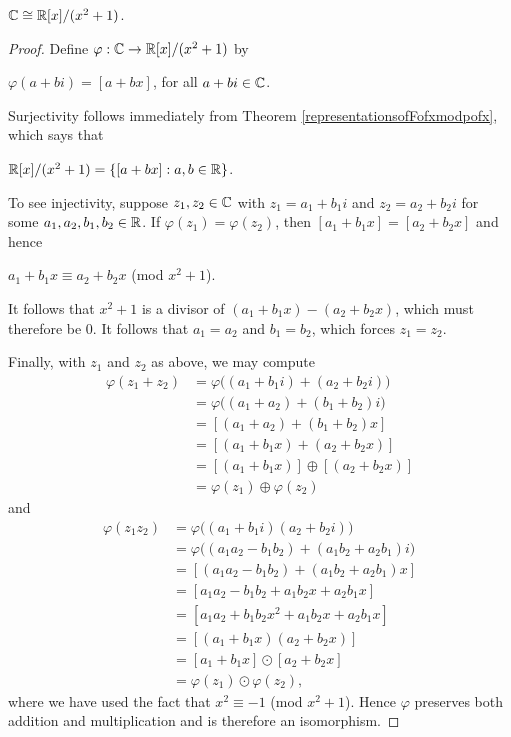 \documentclass[11pt,fleqn,dvipsnames,usenames]{article}
\newcommand{\p}{\noindent}
\begin{document}
\begin{theorem}
$\mathbb{C}\cong\mathbb{R}[x]/(x^2+1)$.
\end{theorem}
%
\begin{proof}
Define $\varphi:\mathbb{C}\to\mathbb{R}[x]/(x^2+1)$ by
\begin{center}
$\varphi(a + bi) = [a + bx]$, for all $a+bi\in\mathbb{C}$.
\end{center}
Surjectivity follows immediately from Theorem \ref{representationsofFofxmodpofx}, which says that
\begin{center}
$\mathbb{R}[x]/(x^2+1) = \left\{[a+bx]:a,b\in\mathbb{R}\right\}$.
\end{center}
\p To see injectivity, suppose $z_{1},z_{2}\in\mathbb{C}$ with $z_{1} = a_{1} + b_{1}i$ and $z_{2} = a_{2} + b_{2}i$ for some $a_{1},a_{2},b_{1},b_{2}\in\mathbb{R}$.  If $\varphi(z_{1}) = \varphi(z_{2})$, then $[a_{1} + b_{1}x] = [a_{2} + b_{2}x]$ and hence
\begin{center}
$a_{1} + b_{1}x\equiv a_{2} + b_{2}x$ (mod $x^2+1$).
\end{center}
It follows that $x^2+1$ is a divisor of $(a_{1} + b_{1}x) - (a_{2} + b_{2}x)$, which must therefore be $0$.  It follows that $a_{1} = a_{2}$ and $b_{1} = b_{2}$, which forces $z_{1} = z_{2}$.
\vsp

\p Finally, with $z_{1}$ and $z_{2}$ as above, we may compute
\begin{align*}
\varphi(z_{1} + z_{2}) &= \varphi\big((a_{1} + b_{1}i) + (a_{2} + b_{2}i)\big)\\
&= \varphi\big((a_{1} + a_{2}) + (b_{1}+b_{2})i\big)\\
&= [(a_{1} + a_{2}) + (b_{1}+b_{2})x]\\
&= [(a_{1} + b_{1}x) + (a_{2} + b_{2}x)]\\
&= [(a_{1} + b_{1}x)]\oplus[(a_{2} + b_{2}x)]\\
&= \varphi(z_{1}) \oplus \varphi(z_{2})
\end{align*}
and
\begin{align*}
\varphi(z_{1}z_{2}) &= \varphi\big((a_{1} + b_{1}i)(a_{2}+b_{2}i)\big)\\
&= \varphi\big((a_{1}a_{2} - b_{1}b_{2}) + (a_{1}b_{2}+a_{2}b_{1})i\big)\\
&= [(a_{1}a_{2} - b_{1}b_{2}) + (a_{1}b_{2}+a_{2}b_{1})x]\\
&= [a_{1}a_{2} - b_{1}b_{2} + a_{1}b_{2}x +a_{2}b_{1}x]\\
&= [a_{1}a_{2} + b_{1}b_{2}x^2 + a_{1}b_{2}x +a_{2}b_{1}x]\\
&= [(a_{1} + b_{1}x)(a_{2}+b_{2}x)]\\
&= [a_{1} + b_{1}x]\odot[a_{2}+b_{2}x]\\
&= \varphi(z_{1})\odot\varphi(z_{2}),
\end{align*}
where we have used the fact that $x^2\equiv -1$ (mod $x^2 + 1$).  Hence $\varphi$ preserves both addition and multiplication and is therefore an isomorphism.
\end{proof}
\end{document}
